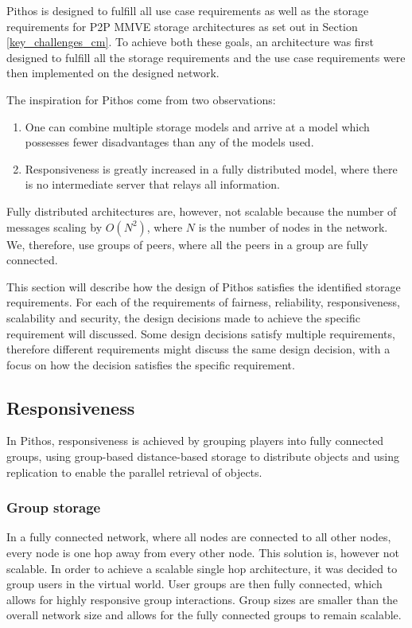 Pithos is designed to fulfill all use case requirements as well as the storage requirements for P2P MMVE storage architectures as set out in Section \ref{key_challenges_cm}. To achieve both these goals, an architecture was first designed to fulfill all the storage requirements and the use case requirements were then implemented on the designed network.

The inspiration for Pithos come from two observations:
%
\begin{enumerate}
  \item One can combine multiple storage models and arrive at a model which possesses fewer disadvantages than any of the models used.
  \item Responsiveness is greatly increased in a fully distributed model, where there is no intermediate server that relays all information.
\end{enumerate}

Fully distributed architectures are, however, not scalable because the number of messages scaling by $O(N^2)$, where $N$ is the number of nodes in the network. We, therefore, use groups of peers, where all the peers in a group are fully connected.

This section will describe how the design of Pithos satisfies the identified storage requirements. For each of the requirements of fairness, reliability, responsiveness, scalability and security, the design decisions made to achieve the specific requirement will discussed. Some design decisions satisfy multiple requirements, therefore different requirements might discuss the same design decision, with a focus on how the decision satisfies the specific requirement.

\subsection{Responsiveness}

In Pithos, responsiveness is achieved by grouping players into fully connected groups, using group-based distance-based storage to distribute objects and using replication to enable the parallel retrieval of objects.

\subsubsection{Group storage}

In a fully connected network, where all nodes are connected to all other nodes, every node is one hop away from every other node. This solution is, however not scalable. In order to achieve a scalable single hop architecture, it was decided to group users in the virtual world. User groups are then fully connected, which allows for highly responsive group interactions. Group sizes are smaller than the overall network size and allows for the fully connected groups to remain scalable.

